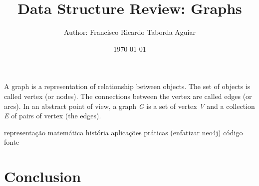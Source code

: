 \documentclass[a4paper]{article}
\title{
    Data Structure Review: Graphs\\
}
\author{
    \small{Author: Francisco Ricardo Taborda Aguiar}\\
}
\date{\today}
\begin{document}
    \maketitle

    A graph is a representation of relationship between objects.
    The set of objects is called vertex (or nodes). The connections 
    between the vertex are called edges (or arcs).
    In an abstract point of view, a graph \emph{G} is a set of vertex 
    \emph{V} and a collection \emph{E} of pairs of vertex (the edges).

    representação matemática
    história
    aplicações práticas (enfatizar neo4j)
    código fonte

        \cite{goodrich:2014}


    \section*{Conclusion}

    
     
\end{document}
